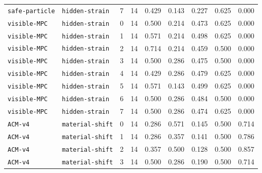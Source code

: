 \documentclass{article}
\begin{document}
\begin{center}
\begin{tabular}{llccccccc}
\texttt{safe-particle} & \texttt{hidden-strain} & 7 & 14 & 0.429 & 0.143 & 0.227 & 0.625 & 0.000 \\
\texttt{visible-MPC} & \texttt{hidden-strain} & 0 & 14 & 0.500 & 0.214 & 0.473 & 0.625 & 0.000 \\
\texttt{visible-MPC} & \texttt{hidden-strain} & 1 & 14 & 0.571 & 0.214 & 0.498 & 0.625 & 0.000 \\
\texttt{visible-MPC} & \texttt{hidden-strain} & 2 & 14 & 0.714 & 0.214 & 0.459 & 0.500 & 0.000 \\
\texttt{visible-MPC} & \texttt{hidden-strain} & 3 & 14 & 0.500 & 0.286 & 0.475 & 0.500 & 0.000 \\
\texttt{visible-MPC} & \texttt{hidden-strain} & 4 & 14 & 0.429 & 0.286 & 0.479 & 0.625 & 0.000 \\
\texttt{visible-MPC} & \texttt{hidden-strain} & 5 & 14 & 0.571 & 0.143 & 0.499 & 0.625 & 0.000 \\
\texttt{visible-MPC} & \texttt{hidden-strain} & 6 & 14 & 0.500 & 0.286 & 0.484 & 0.500 & 0.000 \\
\texttt{visible-MPC} & \texttt{hidden-strain} & 7 & 14 & 0.500 & 0.286 & 0.474 & 0.625 & 0.000 \\
\texttt{ACM-v4} & \texttt{material-shift} & 0 & 14 & 0.286 & 0.571 & 0.145 & 0.500 & 0.714 \\
\texttt{ACM-v4} & \texttt{material-shift} & 1 & 14 & 0.286 & 0.357 & 0.141 & 0.500 & 0.786 \\
\texttt{ACM-v4} & \texttt{material-shift} & 2 & 14 & 0.357 & 0.500 & 0.128 & 0.500 & 0.857 \\
\texttt{ACM-v4} & \texttt{material-shift} & 3 & 14 & 0.500 & 0.286 & 0.190 & 0.500 & 0.714 \\
\bottomrule
\end{tabular}
\end{center}
\end{document}

